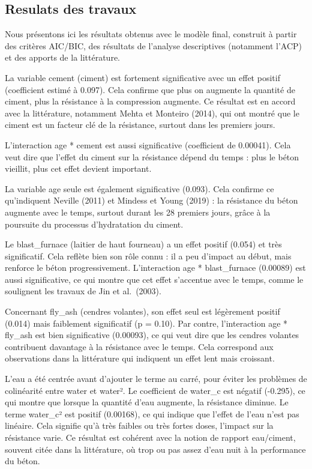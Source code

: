 \documentclass[
  12pt,
]{article}
\begin{document}
\subsection{Resulats des travaux}\label{resulats-des-travaux}

Nous présentons ici les résultats obtenus avec le modèle final,
construit à partir des critères AIC/BIC, des résultats de l'analyse
descriptives (notamment l'ACP) et des apports de la littérature.

La variable cement (ciment) est fortement significative avec un effet
positif (coefficient estimé à 0.097). Cela confirme que plus on augmente
la quantité de ciment, plus la résistance à la compression augmente. Ce
résultat est en accord avec la littérature, notamment Mehta et Monteiro
(2014), qui ont montré que le ciment est un facteur clé de la
résistance, surtout dans les premiers jours.

L'interaction age * cement est aussi significative (coefficient de
0.00041). Cela veut dire que l'effet du ciment sur la résistance dépend
du temps : plus le béton vieillit, plus cet effet devient important.

La variable age seule est également significative (0.093). Cela confirme
ce qu'indiquent Neville (2011) et Mindess et Young (2019) : la
résistance du béton augmente avec le temps, surtout durant les 28
premiers jours, grâce à la poursuite du processus d'hydratation du
ciment.

Le blast\_furnace (laitier de haut fourneau) a un effet positif (0.054)
et très significatif. Cela reflète bien son rôle connu : il a peu
d'impact au début, mais renforce le béton progressivement. L'interaction
age * blast\_furnace (0.00089) est aussi significative, ce qui montre
que cet effet s'accentue avec le temps, comme le soulignent les travaux
de Jin et al.~(2003).

Concernant fly\_ash (cendres volantes), son effet seul est légèrement
positif (0.014) mais faiblement significatif (p = 0.10). Par contre,
l'interaction age * fly\_ash est bien significative (0.00093), ce qui
veut dire que les cendres volantes contribuent davantage à la résistance
avec le temps. Cela correspond aux observations dans la littérature qui
indiquent un effet lent mais croissant.

L'eau a été centrée avant d'ajouter le terme au carré, pour éviter les
problèmes de colinéarité entre water et water². Le coefficient de
water\_c est négatif (-0.295), ce qui montre que lorsque la quantité
d'eau augmente, la résistance diminue. Le terme water\_c² est positif
(0.00168), ce qui indique que l'effet de l'eau n'est pas linéaire. Cela
signifie qu'à très faibles ou très fortes doses, l'impact sur la
résistance varie. Ce résultat est cohérent avec la notion de rapport
eau/ciment, souvent citée dans la littérature, où trop ou pas assez
d'eau nuit à la performance du béton.
\end{document}
